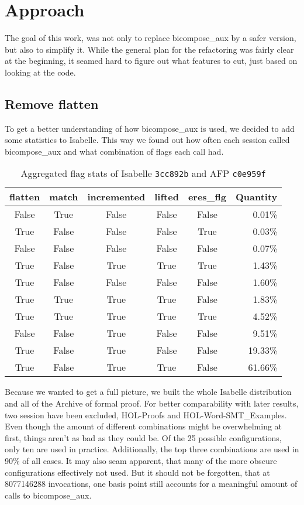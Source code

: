 \chapter{Approach}\label{chapter:approach}

The goal of this work, was not only to replace bicompose\_aux by a safer version, but also to simplify it. While the general plan for the refactoring was fairly clear at the beginning, it seamed hard to figure out what features to cut, just based on looking at the code.

\section{Remove flatten}

To get a better understanding of how bicompose\_aux is used, we decided to add some statistics to Isabelle. This way we found out how often each session called bicompose\_aux and what combination of flags each call had.

\begin{table}[ht]
\caption{Aggregated flag stats of Isabelle \texttt{3cc892b} and AFP \texttt{c0e959f}}
\begin{tabular}{*{5}{c} r}
flatten & match & incremented & lifted & eres\_flg & Quantity\\ \hline
False & True & False & False & False & 0.01\%\\
True & False & False & False & True & 0.03\%\\
False & False & False & False & False & 0.07\%\\
True & False & True & True & True & 1.43\%\\
True & False & False & False & False & 1.60\%\\
True & True & True & True & False & 1.83\%\\
True & True & True & True & True & 4.52\%\\
False & False & True & False & False & 9.51\%\\
True & False & True & False & False & 19.33\%\\
True & False & True & True & False & 61.66\%\\
\end{tabular}
\label{tab:agg_baseline}
\centering
\end{table}

Because we wanted to get a full picture, we built the whole Isabelle distribution and all of the Archive of formal proof. For better comparability with later results, two session have been excluded, HOL-Proofs and HOL-Word-SMT\_Examples.\\
Even though the amount of different combinations might be overwhelming at first, things aren't as bad as they could be. Of the 25 possible configurations, only ten are used in practice. Additionally, the top three combinations are used in 90\% of all cases. It may also seam apparent, that many of the more obscure configurations effectively not used. But it should not be forgotten, that at 8077146288 invocations, one basis point still accounts for a meaningful amount of calls to bicompose\_aux.

